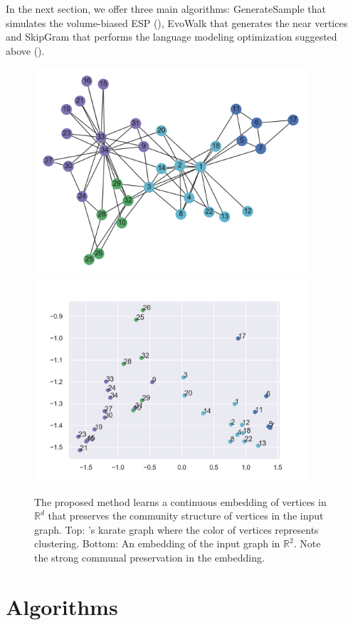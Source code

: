 \documentclass{article}
\begin{document}
In the next section, we offer three main algorithms: GenerateSample that simulates the volume-biased ESP (\cite{Shayan}), EvoWalk that generates the
near vertices and SkipGram that performs the language modeling optimization suggested above (\cite{mikolov2013efficient}).
\begin{figure}
  \begin{center}
\includegraphics[width=4in]{embd/karate.png}
\includegraphics[width=4in]{embd/karate_embd.png}
  \end{center}
\caption{The proposed method learns a continuous embedding of vertices in \(\mathbb{R}^d\)
        that preserves the community structure of vertices in the input graph.
        Top: \cite{Zachary}'s karate graph where the color of vertices represents
        clustering. Bottom: An embedding of the input graph in \(\mathbb{R}^2\).
        Note the strong communal preservation in the embedding.}
  \label{fig:1}
\end{figure}

\newpage
\section{Algorithms}
\end{document}
